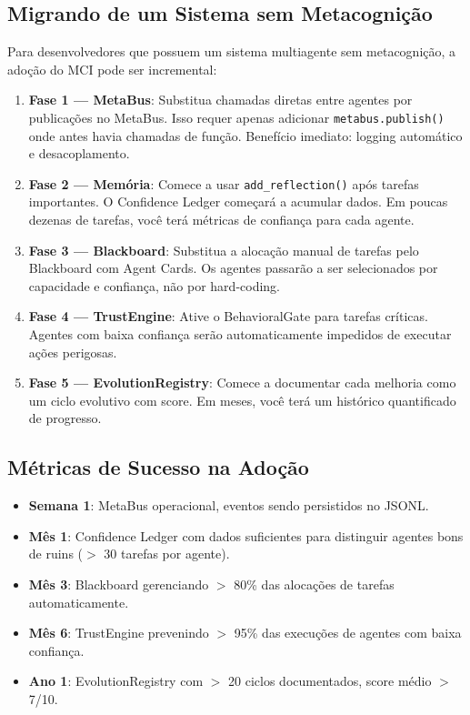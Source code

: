 \subsection{Migrando de um Sistema sem Metacognição}

Para desenvolvedores que possuem um sistema multiagente sem metacognição, a adoção do MCI pode ser incremental:

\begin{enumerate}
    \item \textbf{Fase 1 — MetaBus}: Substitua chamadas diretas entre agentes por publicações no MetaBus. Isso requer apenas adicionar \texttt{metabus.publish()} onde antes havia chamadas de função. Benefício imediato: logging automático e desacoplamento.
    
    \item \textbf{Fase 2 — Memória}: Comece a usar \texttt{add\_reflection()} após tarefas importantes. O Confidence Ledger começará a acumular dados. Em poucas dezenas de tarefas, você terá métricas de confiança para cada agente.
    
    \item \textbf{Fase 3 — Blackboard}: Substitua a alocação manual de tarefas pelo Blackboard com Agent Cards. Os agentes passarão a ser selecionados por capacidade e confiança, não por hard-coding.
    
    \item \textbf{Fase 4 — TrustEngine}: Ative o BehavioralGate para tarefas críticas. Agentes com baixa confiança serão automaticamente impedidos de executar ações perigosas.
    
    \item \textbf{Fase 5 — EvolutionRegistry}: Comece a documentar cada melhoria como um ciclo evolutivo com score. Em meses, você terá um histórico quantificado de progresso.
\end{enumerate}

\subsection{Métricas de Sucesso na Adoção}

\begin{itemize}
    \item \textbf{Semana 1}: MetaBus operacional, eventos sendo persistidos no JSONL.
    \item \textbf{Mês 1}: Confidence Ledger com dados suficientes para distinguir agentes bons de ruins ($>$ 30 tarefas por agente).
    \item \textbf{Mês 3}: Blackboard gerenciando $>$ 80\% das alocações de tarefas automaticamente.
    \item \textbf{Mês 6}: TrustEngine prevenindo $>$ 95\% das execuções de agentes com baixa confiança.
    \item \textbf{Ano 1}: EvolutionRegistry com $>$ 20 ciclos documentados, score médio $>$ 7/10.
\end{itemize}

